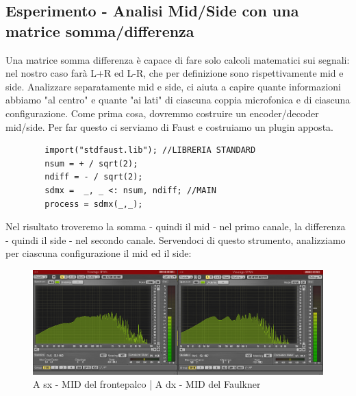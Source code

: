 \documentclass{article}
\begin{document}
\subsection{Esperimento - Analisi Mid/Side con una matrice somma/differenza}
    Una matrice somma differenza è capace di fare solo calcoli matematici sui segnali: nel nostro caso farà L+R ed L-R, che per definizione sono rispettivamente mid e side. Analizzare separatamente mid e side, ci aiuta a capire quante informazioni abbiamo "al centro" e quante "ai lati" di ciascuna coppia microfonica e di ciascuna configurazione.
    Come prima cosa, dovremmo costruire un encoder/decoder mid/side. Per far questo ci serviamo di Faust e costruiamo un plugin apposta.
    
          
    \begin{lstlisting}
        import("stdfaust.lib"); //LIBRERIA STANDARD
        nsum = + / sqrt(2);
        ndiff = - / sqrt(2);
        sdmx =  _, _ <: nsum, ndiff; //MAIN
        process = sdmx(_,_);
    \end{lstlisting}
    
    Nel risultato troveremo la somma - quindi il mid - nel primo canale, la differenza - quindi il side - nel secondo canale.
    Servendoci di questo strumento, analizziamo per ciascuna configurazione il mid ed il side:
    
    \begin{figure}[H]
        \centering
        \includegraphics[width=1\textwidth]{images/5PLOT-MID.png}
         \caption{\label{fig11}A sx - MID del frontepalco | A dx - MID del Faulkner}
    \end{figure}
    
\end{document}
